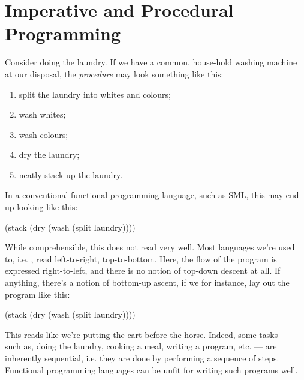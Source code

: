 \chapter{Imperative and Procedural Programming}

Consider doing the laundry. If we have a common, house-hold washing machine at
our disposal, the \emph{procedure} may look something like this:

\begin{enumerate}

\item split the laundry into whites and colours;

\item wash whites;

\item wash colours;

\item dry the laundry;

\item neatly stack up the laundry.

\end{enumerate}

In a conventional functional programming language, such as SML, this may end up
looking like this:

\begin{code}
(stack (dry (wash (split laundry))))
\end{code}

While comprehensible, this does not read very well. Most languages we're used
to, i.e. , read
left-to-right, top-to-bottom. Here, the flow of the program is expressed
right-to-left, and there is no notion of top-down descent at all. If anything,
there's a notion of bottom-up ascent, if we for instance, lay out the program
like this:

\begin{codebox}
(stack
  (dry
    (wash
      (split laundry))))
\end{codebox}

This reads like we're putting the cart before the horse. Indeed, some tasks ---
such as, doing the laundry, cooking a meal, writing a program, etc. --- are
inherently sequential, i.e. they are done by performing a sequence of steps.
Functional programming languages can be  unfit for writing such programs well.

